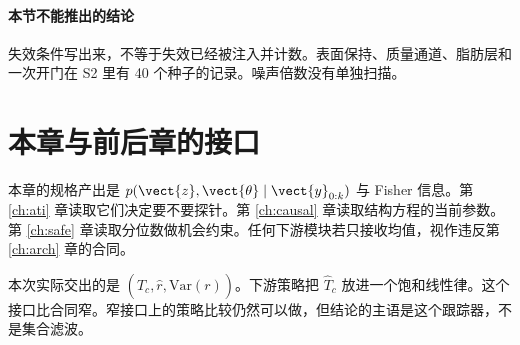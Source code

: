 \paragraph{本节不能推出的结论}
失效条件写出来，不等于失效已经被注入并计数。表面保持、质量通道、脂肪层和一次开门在 S2 里有 40 个种子的记录。噪声倍数没有单独扫描。

\section{本章与前后章的接口}

本章的规格产出是 \(p(\vect{z},\vect{\theta}\mid\vect{y}_{0:k})\) 与 Fisher 信息。第 \ref{ch:ati} 章读取它们决定要不要探针。第 \ref{ch:causal} 章读取结构方程的当前参数。第 \ref{ch:safe} 章读取分位数做机会约束。任何下游模块若只接收均值，视作违反第 \ref{ch:arch} 章的合同。

本次实际交出的是 \((\hat T_c,\hat r,\mathrm{Var}(r))\)。下游策略把 \(\hat T_c\) 放进一个饱和线性律。这个接口比合同窄。窄接口上的策略比较仍然可以做，但结论的主语是这个跟踪器，不是集合滤波。
